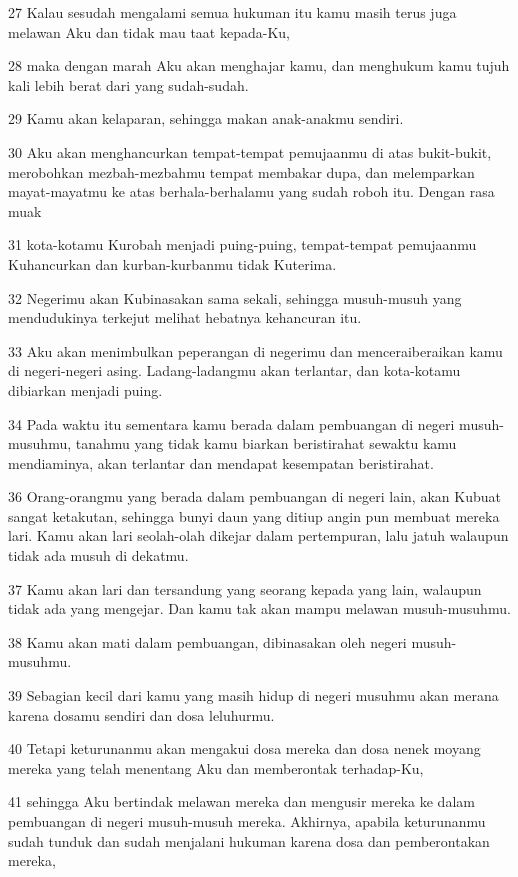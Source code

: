 \par 27 Kalau sesudah mengalami semua hukuman itu kamu masih terus juga melawan Aku dan tidak mau taat kepada-Ku,
\par 28 maka dengan marah Aku akan menghajar kamu, dan menghukum kamu tujuh kali lebih berat dari yang sudah-sudah.
\par 29 Kamu akan kelaparan, sehingga makan anak-anakmu sendiri.
\par 30 Aku akan menghancurkan tempat-tempat pemujaanmu di atas bukit-bukit, merobohkan mezbah-mezbahmu tempat membakar dupa, dan melemparkan mayat-mayatmu ke atas berhala-berhalamu yang sudah roboh itu. Dengan rasa muak
\par 31 kota-kotamu Kurobah menjadi puing-puing, tempat-tempat pemujaanmu Kuhancurkan dan kurban-kurbanmu tidak Kuterima.
\par 32 Negerimu akan Kubinasakan sama sekali, sehingga musuh-musuh yang mendudukinya terkejut melihat hebatnya kehancuran itu.
\par 33 Aku akan menimbulkan peperangan di negerimu dan menceraiberaikan kamu di negeri-negeri asing. Ladang-ladangmu akan terlantar, dan kota-kotamu dibiarkan menjadi puing.
\par 34 Pada waktu itu sementara kamu berada dalam pembuangan di negeri musuh-musuhmu, tanahmu yang tidak kamu biarkan beristirahat sewaktu kamu mendiaminya, akan terlantar dan mendapat kesempatan beristirahat.
\par 36 Orang-orangmu yang berada dalam pembuangan di negeri lain, akan Kubuat sangat ketakutan, sehingga bunyi daun yang ditiup angin pun membuat mereka lari. Kamu akan lari seolah-olah dikejar dalam pertempuran, lalu jatuh walaupun tidak ada musuh di dekatmu.
\par 37 Kamu akan lari dan tersandung yang seorang kepada yang lain, walaupun tidak ada yang mengejar. Dan kamu tak akan mampu melawan musuh-musuhmu.
\par 38 Kamu akan mati dalam pembuangan, dibinasakan oleh negeri musuh-musuhmu.
\par 39 Sebagian kecil dari kamu yang masih hidup di negeri musuhmu akan merana karena dosamu sendiri dan dosa leluhurmu.
\par 40 Tetapi keturunanmu akan mengakui dosa mereka dan dosa nenek moyang mereka yang telah menentang Aku dan memberontak terhadap-Ku,
\par 41 sehingga Aku bertindak melawan mereka dan mengusir mereka ke dalam pembuangan di negeri musuh-musuh mereka. Akhirnya, apabila keturunanmu sudah tunduk dan sudah menjalani hukuman karena dosa dan pemberontakan mereka,
